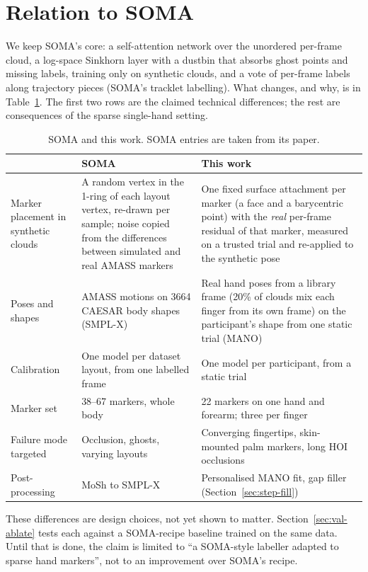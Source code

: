 \documentclass[11pt,a4paper]{article}
\begin{document}
\section{Relation to SOMA}\label{sec:soma-diff}
We keep SOMA's core: a self-attention network over the unordered per-frame cloud, a log-space Sinkhorn layer with a
dustbin that absorbs ghost points and missing labels, training only on synthetic clouds, and a vote of per-frame labels
along trajectory pieces (SOMA's tracklet labelling). What changes, and why, is in Table~\ref{tab:soma-diff}. The first two
rows are the claimed technical differences; the rest are consequences of the sparse single-hand setting.
\begin{table}[h]\centering\small
\caption{SOMA \citep{ghorbani2021soma} and this work. SOMA entries are taken from its paper.}\label{tab:soma-diff}
\begin{tabularx}{\linewidth}{@{}p{2.6cm}XX@{}}\toprule
 & SOMA & This work \\\midrule
Marker placement in synthetic clouds & A random vertex in the 1-ring of each layout vertex, re-drawn per sample; noise copied from the differences between simulated and real AMASS markers & One fixed surface attachment per marker (a face and a barycentric point) with the \emph{real} per-frame residual of that marker, measured on a trusted trial and re-applied to the synthetic pose \\
Poses and shapes & AMASS motions on 3664 CAESAR body shapes (SMPL-X) & Real hand poses from a library frame (20\% of clouds mix each finger from its own frame) on the participant's shape from one static trial (MANO) \\
Calibration & One model per dataset layout, from one labelled frame & One model per participant, from a static trial \\
Marker set & 38--67 markers, whole body & 22 markers on one hand and forearm; three per finger \\
Failure mode targeted & Occlusion, ghosts, varying layouts & Converging fingertips, skin-mounted palm markers, long HOI occlusions \\
Post-processing & MoSh to SMPL-X & Personalised MANO fit, gap filler (Section~\ref{sec:step-fill}) \\\bottomrule
\end{tabularx}
\end{table}
These differences are design choices, not yet shown to matter. Section~\ref{sec:val-ablate} tests each against a
SOMA-recipe baseline trained on the same data. Until that is done, the claim is limited to ``a SOMA-style labeller
adapted to sparse hand markers'', not to an improvement over SOMA's recipe.
\end{document}
